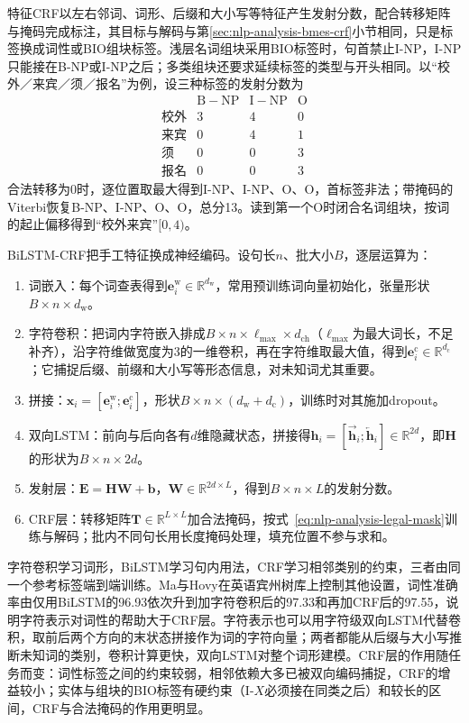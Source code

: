 特征CRF以左右邻词、词形、后缀和大小写等特征产生发射分数，配合转移矩阵与掩码完成标注，其目标与解码与第\ref{sec:nlp-analysis-bmes-crf}小节相同，只是标签换成词性或BIO组块标签。浅层名词组块采用BIO标签时，句首禁止I-NP，I-NP只能接在B-NP或I-NP之后；多类组块还要求延续标签的类型与开头相同。以“校外／来宾／须／报名”为例，设三种标签的发射分数为
\[
\begin{array}{c|rrr}
 &\mathrm{B\!-\!NP}&\mathrm{I\!-\!NP}&\mathrm O\\ \hline
 \text{校外}&3&4&0\\
 \text{来宾}&0&4&1\\
 \text{须}&0&0&3\\
 \text{报名}&0&0&3
\end{array}
\]
合法转移为0时，逐位置取最大得到I-NP、I-NP、O、O，首标签非法；带掩码的Viterbi恢复B-NP、I-NP、O、O，总分13。读到第一个O时闭合名词组块，按词的起止偏移得到“校外来宾”$[0,4)$。

BiLSTM-CRF把手工特征换成神经编码。设句长$n$、批大小$B$，逐层运算为：
\begin{enumerate}
  \item 词嵌入：每个词查表得到$\bm e^{\mathrm w}_i\in\mathbb R^{d_{\mathrm w}}$，常用预训练词向量初始化，张量形状$B\times n\times d_{\mathrm w}$。
  \item 字符卷积：把词内字符嵌入排成$B\times n\times\ell_{\max}\times d_{\mathrm{ch}}$（$\ell_{\max}$为最大词长，不足补齐），沿字符维做宽度为3的一维卷积，再在字符维取最大值，得到$\bm e^{\mathrm c}_i\in\mathbb R^{d_{\mathrm c}}$；它捕捉后缀、前缀和大小写等形态信息，对未知词尤其重要。
  \item 拼接：$\bm x_i=[\bm e^{\mathrm w}_i;\bm e^{\mathrm c}_i]$，形状$B\times n\times(d_{\mathrm w}+d_{\mathrm c})$，训练时对其施加dropout。
  \item 双向LSTM：前向与后向各有$d$维隐藏状态，拼接得$\bm h_i=[\overrightarrow{\bm h}_i;\overleftarrow{\bm h}_i]\in\mathbb R^{2d}$，即$\bm H$的形状为$B\times n\times2d$。
  \item 发射层：$\bm E=\bm H\bm W+\bm b$，$\bm W\in\mathbb R^{2d\times L}$，得到$B\times n\times L$的发射分数。
  \item CRF层：转移矩阵$\bm T\in\mathbb R^{L\times L}$加合法掩码，按式~\eqref{eq:nlp-analysis-legal-mask}训练与解码；批内不同句长用长度掩码处理，填充位置不参与求和。
\end{enumerate}
字符卷积学习词形，BiLSTM学习句内用法，CRF学习相邻类别的约束，三者由同一个参考标签端到端训练。Ma与Hovy在英语宾州树库上控制其他设置，词性准确率由仅用BiLSTM的96.93依次升到加字符卷积后的97.33和再加CRF后的97.55，说明字符表示对词性的帮助大于CRF层。字符表示也可以用字符级双向LSTM代替卷积，取前后两个方向的末状态拼接作为词的字符向量；两者都能从后缀与大小写推断未知词的类别，卷积计算更快，双向LSTM对整个词形建模。CRF层的作用随任务而变：词性标签之间的约束较弱，相邻依赖大多已被双向编码捕捉，CRF的增益较小；实体与组块的BIO标签有硬约束（I-$X$必须接在同类之后）和较长的区间，CRF与合法掩码的作用更明显。

